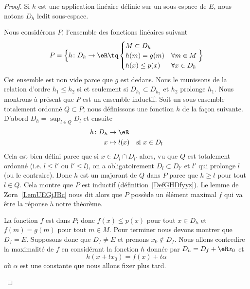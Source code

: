 \begin{proof}
	Si \( h\) est une application linéaire définie sur un sous-espace de \( E\), nous notons \( D_h\) ledit sous-espace.

	\begin{subproof}

		Nous considérons \( P\), l'ensemble des fonctions linéaires suivant
		\begin{equation}
			P=\Big\{  h\colon D_h\to \eR\tq
			\begin{cases}
				M\subset D_h                     \\
				h(m)=g(m)     & \forall m\in M   \\
				h(x)\leq p(x) & \forall x\in D_h
			\end{cases}
			\Big\}
		\end{equation}
		Cet ensemble est non vide parce que \( g\) est dedans. Nous le munissons de la relation d'ordre \( h_1\leq h_2\) si et seulement si \( D_{h_1}\subset D_{h_2}\) et \( h_2\) prolonge \( h_1\). Nous montrons à présent que \( P\) est un ensemble inductif. Soit un sous-ensemble totalement ordonné \( Q\subset P\); nous définissons une fonction \( h\) de la façon suivante. D'abord \( D_h=\sup_{l\in Q}D_l\) et ensuite
		\begin{equation}
			\begin{aligned}
				h\colon D_h & \to \eR                            \\
				x           & \mapsto l(x) & \text{si } x\in D_l
			\end{aligned}
		\end{equation}
		Cela est bien défini parce que si \( x\in D_l\cap D_{l'}\) alors, vu que \( Q\) est totalement ordonné (i.e. \( l\leq l'\) ou \( l'\leq l\)), on a obligatoirement \( D_l\subset D_{l'}\) et \( l'\) qui prolonge \( l\) (ou le contraire). Donc \( h\) est un majorant de \( Q\) dans \( P\) parce que \( h\geq l\) pour tout \( l\in Q\). Cela montre que \( P\) est inductif (définition~\ref{DefGHDfyyz}). Le lemme de Zorn~\ref{LemUEGjJBc} nous dit alors que \( P\) possède un élément maximal \( f\) qui va être la réponse à notre théorème.

		\spitem[Le support de \( f\)]

		La fonction \( f\) est dans \( P\); donc \( f(x)\leq p(x)\) pour tout \( x\in D_h\) et \( f(m)=g(m)\) pour tout \( m\in M\). Pour terminer nous devons montrer que \( D_f=E\). Supposons donc que \( D_f\neq E\) et prenons \( x_0\notin D_f\). Nous allons contredire la maximalité de \( f\) en considérant la fonction \( h\) donnée par \( D_h=D_f+\eR x_0 \) et
		\begin{equation}
			h(x+tx_0)=f(x)+t\alpha
		\end{equation}
		où \( \alpha\) est une constante que nous allons fixer plus tard.


\end{subproof}
\end{proof}
